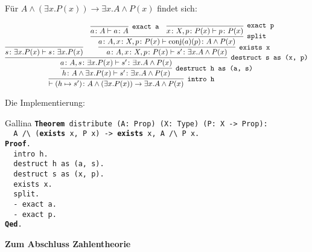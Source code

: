 \documentclass[8pt]{beamer}
\newcommand{\strong}[1]{\textsf{\textbf{#1}}}
\newcommand{\centerheadline}[1]{%
  \begin{center}\strong{#1}\end{center}}
\newcommand{\kw}[1]{\textbf{#1}}
\begin{document}
\begin{frame}
Für $A\land (\exists x. P(x))\to\exists x. A\land P(x)$ findet sich:\pause
\begin{small}
\[
\infer[\texttt{intro h}]{\vdash (h\mapsto s')\colon A\land (\exists x. P(x))\to\exists x. A\land P(x)}{
  \infer[\texttt{destruct h as (a, s)}]{h\colon A\land\exists x. P(x)\vdash s'\colon\exists x. A\land P(x)}{
    \infer[\texttt{destruct s as (x, p)}]{a\colon A,s\colon\exists x.P(x)\vdash s'\colon\exists x.A\land P(x)}{
      \infer{s\colon\exists x.P(x)\vdash s\colon\exists x.P(x)}{}
    & \infer[\texttt{exists x}]{a\colon A,x\colon X,p\colon P(x)\vdash s'\colon\exists x.A\land P(x)}{
        \infer[\texttt{split}]{a\colon A,x\colon X,p\colon P(x)\vdash \mathrm{conj}(a)(p)\colon A\land P(x)}{
          \infer[\texttt{exact a}]{a\colon A\vdash a\colon A}{}
        & \infer[\texttt{exact p}]{x\colon X,p\colon P(x)\vdash p\colon P(x)}{}}}}}}
\]
\end{small}\pause
Die Implementierung:
\begin{block}{Gallina}
\texttt{\kw{Theorem} distribute (A: Prop) (X: Type) (P: X -> Prop):\\
\ \ A /{\textbackslash} (\kw{exists} x, P x) -> \kw{exists} x, A /{\textbackslash} P x.\\
\kw{Proof}.\\
\ \ intro h.\\
\ \ destruct h as (a, s).\\
\ \ destruct s as (x, p).\\
\ \ exists x.\\
\ \ split.\\
\ \ - exact a.\\
\ \ - exact p.\\
\kw{Qed}.}
\end{block}
\end{frame}

\begin{frame}
\centerheadline{Zum Abschluss Zahlentheorie}
\end{frame}
\end{document}

